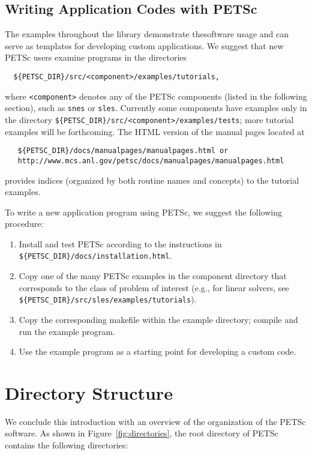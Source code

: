 \subsection*{Writing Application Codes with PETSc}

The examples throughout the library demonstrate thesoftware usage
and can serve as templates for developing
custom applications.  We suggest that new PETSc
users examine programs in the directories 
\begin{verbatim}
  ${PETSC_DIR}/src/<component>/examples/tutorials,
\end{verbatim}
where {\tt <component>}
denotes any of the PETSc components (listed in the following
section), such as {\tt snes} or {\tt sles}.  
Currently some components have examples only in the directory
{\tt \$\{PETSC\_DIR\}/src/<component>/examples/tests}; more tutorial examples
will be forthcoming.  The HTML version of the manual pages located at
\begin{verbatim}
   ${PETSC_DIR}/docs/manualpages/manualpages.html or 
   http://www.mcs.anl.gov/petsc/docs/manualpages/manualpages.html
\end{verbatim}
provides indices (organized by both routine names and concepts) to the tutorial examples.

To write a new application program using PETSc, we suggest the
following procedure:
\begin{enumerate}
\item Install and test PETSc according to the instructions in 
      {\tt \$\{PETSC\_DIR\}/docs/installation.html}.
\item Copy one of the many PETSc examples in the component directory
      that corresponds to the class of problem of interest (e.g.,
      for linear solvers, see {\tt \$\{PETSC\_DIR\}/src/sles/examples/tutorials}).
\item Copy the corresponding makefile within the example directory;
      compile and run the example program.
\item Use the example program as a starting point for developing a custom code.
\end{enumerate}


\section{Directory Structure}

We conclude this introduction with an overview of the
organization of the PETSc software.  As shown in Figure~\ref{fig:directories},
the root directory of PETSc contains the following directories:

